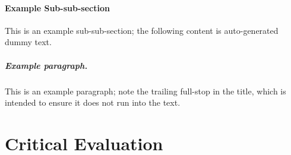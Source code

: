 \documentclass[ oneside,%
                    author={James Elgar},
                    degree={MEng},
                     title={Bidirectional transformer between functional and \\ object-oriented programming in Rust},
                  subtitle={}]{dissertation}
\begin{document}


% 

\subsubsection{Example Sub-sub-section}

This is an example sub-sub-section;
the following content is auto-generated dummy text.

\paragraph{Example paragraph.}

This is an example paragraph; note the trailing full-stop in the title,
which is intended to ensure it does not run into the text.


\chapter{Critical Evaluation}
\label{chap:evaluation}
\end{document}
